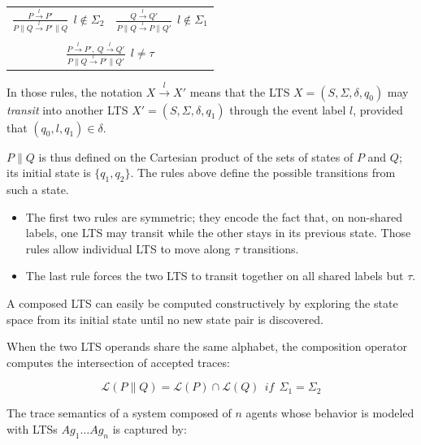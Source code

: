 \begin{center}
\begin{tabular}{cc}
$\frac{\displaystyle P \stackrel{l}{\longrightarrow} P'}{\displaystyle P \parallel Q \stackrel{l}{\longrightarrow} P' \parallel Q}~~l \notin \Sigma_2$ &
$\frac{\displaystyle Q \stackrel{l}{\longrightarrow} Q'}{\displaystyle P \parallel Q \stackrel{l}{\longrightarrow} P \parallel Q'}~~l \notin \Sigma_1$ \\
 & \\
\multicolumn{2}{c}{$\frac{\displaystyle P \stackrel{l}{\longrightarrow} P',~Q \stackrel{l}{\longrightarrow} Q'}{\displaystyle P \parallel Q \stackrel{l}{\longrightarrow} P' \parallel Q'}~~l \neq \tau$} \\
\end{tabular}
\end{center}

In those rules, the notation $X \stackrel{l}{\longrightarrow} X'$ means that the LTS $X = (S,\Sigma,\delta,q_0)$ may \emph{transit} into another LTS $X' = (S,\Sigma,\delta,q_1)$ through the event label $l$, provided that $(q_0,l,q_1) \in \delta$. 

$P \parallel Q$ is thus defined on the Cartesian product of the sets of states of $P$ and $Q$; its initial state is $\{q_1,q_2\}$. The rules above define the possible transitions from such a state. 

\begin{itemize}
\item The first two rules are symmetric; they encode the fact that, on non-shared labels, one LTS may transit while the other stays in its previous state. Those rules allow individual LTS to move along $\tau$ transitions. 
\item The last rule forces the two LTS to transit together on all shared labels but $\tau$.
\end{itemize}

A composed LTS can easily be computed constructively by exploring the state space from its initial state until no new state pair is discovered. 

When the two LTS operands share the same alphabet, the composition operator computes the intersection of accepted traces:

\begin{equation}
\mathcal{L}(P \parallel Q) = \mathcal{L}(P) \cap \mathcal{L}(Q)~~if~~\Sigma_{1}=\Sigma_{2}
\end{equation}

The trace semantics of a system composed of $n$ agents whose behavior is modeled with LTSs $Ag_1 \ldots Ag_n$ is captured by:


